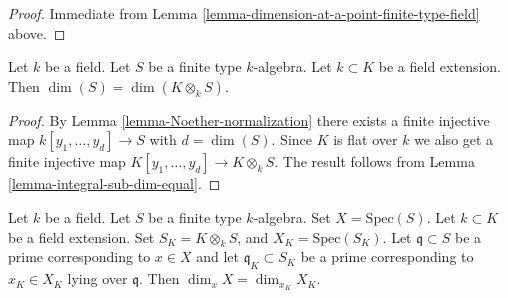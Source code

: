 \begin{proof}
Immediate from Lemma \ref{lemma-dimension-at-a-point-finite-type-field} above.
\end{proof}

\begin{lemma}
\label{lemma-dimension-preserved-field-extension}
Let $k$ be a field.
Let $S$ be a finite type $k$-algebra.
Let $k \subset K$ be a field extension.
Then $\dim(S) = \dim(K \otimes_k S)$.
\end{lemma}

\begin{proof}
By Lemma \ref{lemma-Noether-normalization}
there exists a finite injective map
$k[y_1, \ldots, y_d] \to S$ with $d = \dim(S)$.
Since $K$ is flat over $k$ we also get a finite injective
map $K[y_1, \ldots, y_d] \to K\otimes_k S$.
The result follows from Lemma \ref{lemma-integral-sub-dim-equal}.
\end{proof}

\begin{lemma}
\label{lemma-dimension-at-a-point-preserved-field-extension}
Let $k$ be a field.
Let $S$ be a finite type $k$-algebra.
Set $X = \text{Spec}(S)$.
Let $k \subset K$ be a field extension.
Set $S_K = K \otimes_k S$, and $X_K = \text{Spec}(S_K)$.
Let $\mathfrak q \subset S$ be a prime corresponding to $x \in X$
and let $\mathfrak q_K \subset S_K$ be a prime corresponding
to $x_K \in X_K$ lying over $\mathfrak q$.
Then $\dim_x X = \dim_{x_K} X_K$.
\end{lemma}

